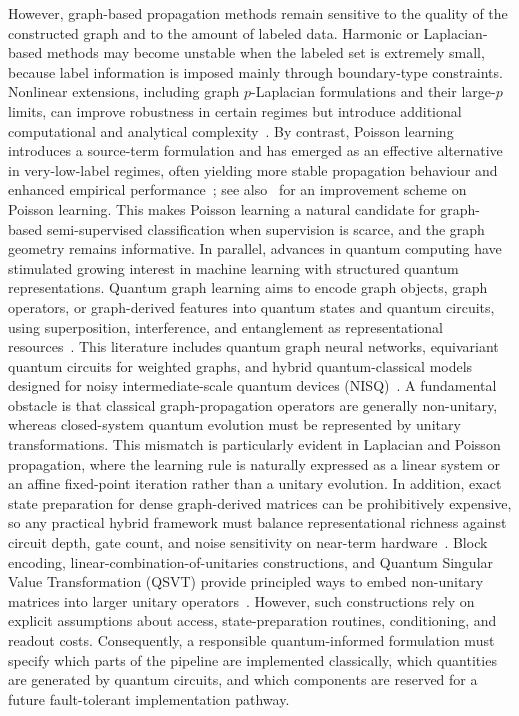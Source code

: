 \documentclass[11pt,a4paper]{article}
\begin{document}
However, graph-based propagation methods remain sensitive to the quality of the constructed graph and to the amount of labeled data. Harmonic or Laplacian-based methods may become unstable when the labeled set is extremely small, because label information is imposed mainly through boundary-type constraints. Nonlinear extensions, including graph \(p\)-Laplacian formulations and their large-\(p\) limits, can improve robustness in certain regimes but introduce additional computational and analytical complexity~\cite{kyng2015algorithms,bozorgnia2026improved}. By contrast, Poisson learning introduces a source-term formulation and has emerged as an effective alternative in very-low-label regimes, often yielding more stable propagation behaviour and enhanced empirical performance~\cite{calder2020poisson}; see also~\cite{bozorgnia2026improved} for an improvement scheme on Poisson learning. This makes Poisson learning a natural candidate for graph-based semi-supervised classification when supervision is scarce, and the graph geometry remains informative.
In parallel, advances in quantum computing have stimulated growing interest in machine learning with structured quantum representations. Quantum graph learning aims to encode graph objects, graph operators, or graph-derived features into quantum states and quantum circuits, using superposition, interference, and entanglement as representational resources~\cite{verdon2019quantum,yu2023quantum,beer2023quantum}. This literature includes quantum graph neural networks, equivariant quantum circuits for weighted graphs, and hybrid quantum-classical models designed for noisy intermediate-scale quantum devices (NISQ)~\cite{skolik2023equivariant,ceschini2024qgnnreview}. A fundamental obstacle is that classical graph-propagation operators are generally non-unitary, whereas closed-system quantum evolution must be represented by unitary transformations. This mismatch is particularly evident in Laplacian and Poisson propagation, where the learning rule is naturally expressed as a linear system or an affine fixed-point iteration rather than a unitary evolution. In addition, exact state preparation for dense graph-derived matrices can be prohibitively expensive, so any practical hybrid framework must balance representational richness against circuit depth, gate count, and noise sensitivity on near-term hardware~\cite{SchuldKilloran2019,schuld2019quantum}. Block encoding, linear-combination-of-unitaries constructions, and Quantum Singular Value Transformation (QSVT) provide principled ways to embed non-unitary matrices into larger unitary operators~\cite{gilyen2019quantum,childs2012,harrow2009hhl}. However, such constructions rely on explicit assumptions about access, state-preparation routines, conditioning, and readout costs. Consequently, a responsible quantum-informed formulation must specify which parts of the pipeline are implemented classically, which quantities are generated by quantum circuits, and which components are reserved for a future fault-tolerant implementation pathway.
\end{document}

